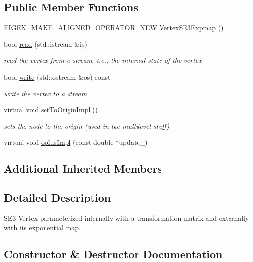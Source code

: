\subsection*{Public Member Functions}
\begin{DoxyCompactItemize}
\item 
E\+I\+G\+E\+N\+\_\+\+M\+A\+K\+E\+\_\+\+A\+L\+I\+G\+N\+E\+D\+\_\+\+O\+P\+E\+R\+A\+T\+O\+R\+\_\+\+N\+EW \mbox{\hyperlink{classg2o_1_1_vertex_s_e3_expmap_a15fc8c37a0d056a562d4df12c872f62a}{Vertex\+S\+E3\+Expmap}} ()
\item 
bool \mbox{\hyperlink{classg2o_1_1_vertex_s_e3_expmap_a4f5913373d24ea5963fffc6830406a52}{read}} (std\+::istream \&is)
\begin{DoxyCompactList}\small\item\em read the vertex from a stream, i.\+e., the internal state of the vertex \end{DoxyCompactList}\item 
bool \mbox{\hyperlink{classg2o_1_1_vertex_s_e3_expmap_ac1dfa6c71532f2e0bed236220bc1b604}{write}} (std\+::ostream \&os) const
\begin{DoxyCompactList}\small\item\em write the vertex to a stream \end{DoxyCompactList}\item 
virtual void \mbox{\hyperlink{classg2o_1_1_vertex_s_e3_expmap_a0d12948c1fb058698bc58177db3806b1}{set\+To\+Origin\+Impl}} ()
\begin{DoxyCompactList}\small\item\em sets the node to the origin (used in the multilevel stuff) \end{DoxyCompactList}\item 
virtual void \mbox{\hyperlink{classg2o_1_1_vertex_s_e3_expmap_a52592993e7ab5de6fe4bb0f9e00c4d39}{oplus\+Impl}} (const double $\ast$update\+\_\+)
\end{DoxyCompactItemize}
\subsection*{Additional Inherited Members}


\subsection{Detailed Description}
S\+E3 Vertex parameterized internally with a transformation matrix and externally with its exponential map. 

\subsection{Constructor \& Destructor Documentation}
\mbox{\label{classg2o_1_1_vertex_s_e3_expmap_a15fc8c37a0d056a562d4df12c872f62a}} 
